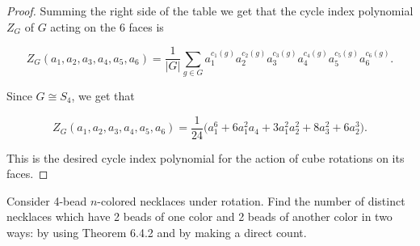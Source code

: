 \documentclass[addpoints,10pt]{exam}
\theoremstyle{plain}
\theoremstyle{definition}
\newtheorem{prob}[thm]{Problem}
\theoremstyle{plain}
\theoremstyle{plain}
\theoremstyle{definition}
\let\oldprob\prob
\let\endoldprob\endprob
\renewenvironment{prob}
  {\begin{singlespace}\oldprob}
  {\endoldprob\end{singlespace}}
\begin{document}
\begin{proof}
Summing the right side of the table we get that the cycle index polynomial $Z_{G}$ of $G$ acting on the $6$ faces is


\[
Z_G(a_1,a_2,a_3,a_4,a_5,a_6)
= \frac{1}{|G|} \sum_{g \in G} a_1^{c_1(g)} a_2^{c_2(g)} a_3^{c_3(g)} a_4^{c_4(g)} a_5^{c_5(g)} a_6^{c_6(g)}.
\]


Since $G\cong S_{4}$, we get that 


\[
Z_G(a_1,a_2,a_3,a_4,a_5,a_6)
= \frac{1}{24}\Big(
  a_1^6
  + 6 a_1^2 a_4
  + 3 a_1^2 a_2^2
  + 8 a_3^2
  + 6 a_2^3
\Big).
\]



This is the desired cycle index polynomial for the action of cube rotations on its faces.

\end{proof}

\newpage
\setcounter{thm}{14}
\renewcommand{\thethm}{\arabic{thm}(a)}
\begin{prob}
 Consider 4-bead $n$-colored necklaces under rotation. Find the number of distinct necklaces which have 2 beads of one color and 2 beads of another color in two ways: by using Theorem 6.4.2 and by making a direct count.
\end{prob}
\setcounter{thm}{0}
\end{document}
